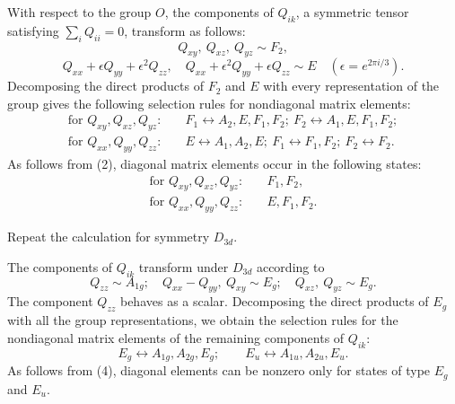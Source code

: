 \SolutionHeading With respect to the group $O$, the components of $Q_{ik}$,
a symmetric tensor satisfying $\sum_iQ_{ii}=0$, transform as follows:
\[
 Q_{xy},\ Q_{xz},\ Q_{yz}\sim F_2,
\]
\[
 Q_{xx}+\epsilon Q_{yy}+\epsilon^2Q_{zz},\quad Q_{xx}+\epsilon^2Q_{yy}+\epsilon Q_{zz}\sim E
 \quad(\epsilon=e^{2\pi i/3}).
\]
Decomposing the direct products of $F_2$ and $E$ with every representation of
the group gives the following selection rules for nondiagonal matrix elements:
\begin{align*}
 \text{for }Q_{xy},Q_{xz},Q_{yz}:&\quad F_1\leftrightarrow A_2,E,F_1,F_2;\ F_2\leftrightarrow A_1,E,F_1,F_2;\\
 \text{for }Q_{xx},Q_{yy},Q_{zz}:&\quad E\leftrightarrow A_1,A_2,E;\ F_1\leftrightarrow F_1,F_2;\ F_2\leftrightarrow F_2.
\end{align*}
As follows from (2), diagonal matrix elements occur in the following states:
\begin{align*}
 \text{for }Q_{xy},Q_{xz},Q_{yz}:&\quad F_1,F_2,\\
 \text{for }Q_{xx},Q_{yy},Q_{zz}:&\quad E,F_1,F_2.
\end{align*}

 Repeat the calculation for symmetry $D_{3d}$.

\SolutionHeading The components of $Q_{ik}$ transform under $D_{3d}$
according to
\[
 Q_{zz}\sim A_{1g};\quad Q_{xx}-Q_{yy},\ Q_{xy}\sim E_g;\quad Q_{xz},\ Q_{yz}\sim E_g.
\]
The component $Q_{zz}$ behaves as a scalar. Decomposing the direct products of
$E_g$ with all the group representations, we obtain the selection rules for
the nondiagonal matrix elements of the remaining components of $Q_{ik}$:
\[
 E_g\leftrightarrow A_{1g},A_{2g},E_g;\qquad E_u\leftrightarrow A_{1u},A_{2u},E_u.
\]
As follows from (4), diagonal elements can be nonzero only for states of type
$E_g$ and $E_u$.
